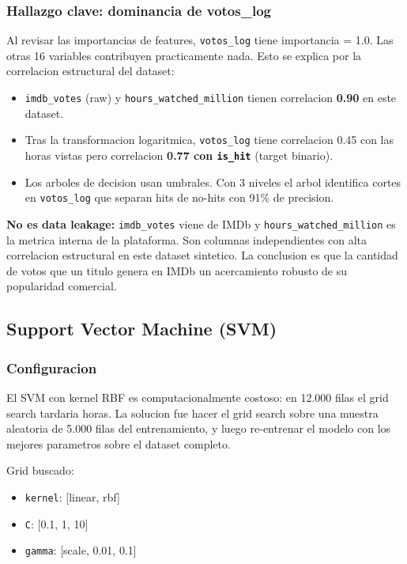 \documentclass[12pt, a4paper]{article}
\begin{document}
\subsubsection{Hallazgo clave: dominancia de votos\_log}

Al revisar las importancias de features, \texttt{votos\_log} tiene importancia = 1.0. Las otras 16 variables contribuyen practicamente nada. Esto se explica por la correlacion estructural del dataset:

\begin{itemize}
\item \texttt{imdb\_votes} (raw) y \texttt{hours\_watched\_million} tienen correlacion \textbf{0.90} en este dataset.
\item Tras la transformacion logaritmica, \texttt{votos\_log} tiene correlacion 0.45 con las horas vistas pero correlacion \textbf{0.77 con \texttt{is\_hit}} (target binario).
\item Los arboles de decision usan umbrales. Con 3 niveles el arbol identifica cortes en \texttt{votos\_log} que separan hits de no-hits con 91\% de precision.
\end{itemize}

\textbf{No es data leakage:} \texttt{imdb\_votes} viene de IMDb y \texttt{hours\_watched\_million} es la metrica interna de la plataforma. Son columnas independientes con alta correlacion estructural en este dataset sintetico. La conclusion es que la cantidad de votos que un titulo genera en IMDb un acercamiento robusto de su popularidad comercial.

\subsection{Support Vector Machine (SVM)}

\subsubsection{Configuracion}

El SVM con kernel RBF es computacionalmente costoso: en 12.000 filas el grid search tardaria horas. La solucion fue hacer el grid search sobre una muestra aleatoria de 5.000 filas del entrenamiento, y luego re-entrenar el modelo con los mejores parametros sobre el dataset completo.

Grid buscado:
\begin{itemize}
\item \texttt{kernel}: [linear, rbf]
\item \texttt{C}: [0.1, 1, 10]
\item \texttt{gamma}: [scale, 0.01, 0.1]
\end{itemize}
\end{document}

